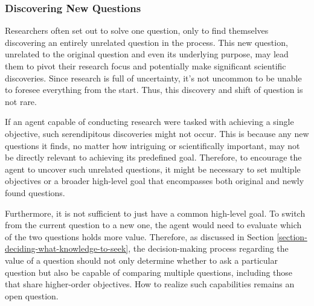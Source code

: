 

\subsubsection{Discovering New Questions}

Researchers often set out to solve one question, only to find themselves discovering an entirely unrelated question in the process. This new question, unrelated to the original question and even its underlying purpose, may lead them to pivot their research focus and potentially make significant scientific discoveries. Since research is full of uncertainty, it's not uncommon to be unable to foresee everything from the start. Thus, this discovery and shift of question is not rare.

If an agent capable of conducting research were tasked with achieving a single objective, such serendipitous discoveries might not occur. This is because any new questions it finds, no matter how intriguing or scientifically important, may not be directly relevant to achieving its predefined goal. Therefore, to encourage the agent to uncover such unrelated questions, it might be necessary to set multiple objectives or a broader high-level goal that encompasses both original and newly found questions. 

Furthermore, it is not sufficient to just have a common high-level goal.
To switch from the current question to a new one, the agent would need to evaluate which of the two questions holds more value. Therefore, as discussed in Section \ref{section-deciding-what-knowledge-to-seek}, the decision-making process regarding the value of a question should not only determine whether to ask a particular question but also be capable of comparing multiple questions, including those that share higher-order objectives. How to realize such capabilities remains an open question.

